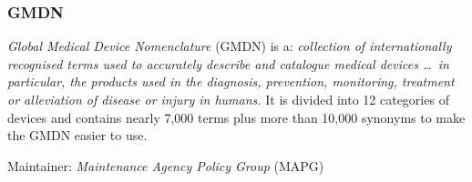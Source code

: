 %
%
%
%
%
%
%

\subsubsection{GMDN}
\label{gmdn_heading}

\emph{Global Medical Device Nomenclature} (GMDN) is a: \textit{collection of
internationally recognised terms used to accurately describe and catalogue
medical devices \ldots\ in particular, the products used in the diagnosis,
prevention, monitoring, treatment or alleviation of disease or injury in
humans.} It is divided into 12 categories of devices and contains nearly 7,000
terms plus more than 10,000 synonyms to make the GMDN easier to use.
\cite{mapg}

Maintainer: \emph{Maintenance Agency Policy Group} (MAPG)

